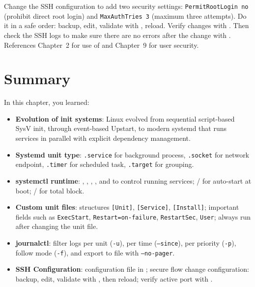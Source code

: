\begin{challengebox}
Change the SSH configuration to add two security settings: \texttt{PermitRootLogin no} (prohibit direct root login) and \texttt{MaxAuthTries 3} (maximum three attempts). Do it in a safe order: backup, edit, validate with , reload. Verify changes with . Then check the SSH logs to make sure there are no errors after the change with . References Chapter~2 for use of  and Chapter~9 for user security.
\end{challengebox}

\section{Summary}
\label{sec:service-summary}

In this chapter, you learned:

\begin{itemize}[noitemsep,topsep=2pt]
\item \textbf{Evolution of init systems}: Linux evolved from sequential script-based SysV init, through event-based Upstart, to modern systemd that runs services in parallel with explicit dependency management.
\item \textbf{Systemd unit type}: \texttt{.service} for background process, \texttt{.socket} for network endpoint, \texttt{.timer} for scheduled task, \texttt{.target} for grouping.
\item \textbf{systemctl runtime}: , , , , and  to control running services; / for auto-start at boot; / for total block.
\item \textbf{Custom unit files}: structures \texttt{[Unit]}, \texttt{[Service]}, \texttt{[Install]}; important fields such as \texttt{ExecStart}, \texttt{Restart=on-failure}, \texttt{RestartSec}, \texttt{User}; always run  after changing the unit file.
\item \textbf{journalctl}: filter logs per unit (\texttt{-u}), per time (\texttt{--since}), per priority (\texttt{-p}), follow mode (\texttt{-f}), and export to file with \texttt{--no-pager}.
\item \textbf{SSH Configuration}: configuration file in ; secure flow change configuration: backup, edit, validate with , then reload; verify active port with .
\end{itemize}

